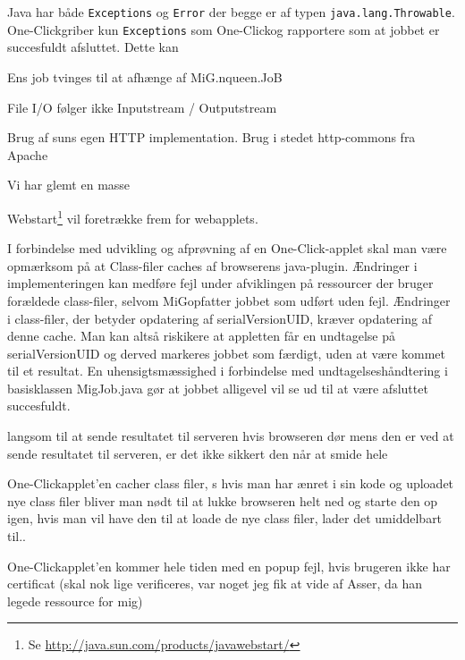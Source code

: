 \documentclass[pdf,draft,a4paper,11pt]{article}
\newcommand{\mig}{MiG}
\newcommand{\oc}{One-Click}
\begin{document}
\begin{description}
	\item[Job fejler ikke hvis der kastes en kastes en \texttt{java.lang.Error}]  Java har både \texttt{Exceptions} og \texttt{Error} der begge er af typen \texttt{java.lang.Throwable}. \oc griber kun \texttt{Exceptions} som \oc og rapportere som at jobbet er succesfuldt afsluttet. Dette kan  
	\item Ens job tvinges til at afhænge af MiG.nqueen.JoB
	\item File I/O følger ikke Inputstream / Outputstream	
	\item Brug af suns egen HTTP implementation. Brug i stedet http-commons fra Apache
	\item Vi har glemt en masse 
	\item Webstart\footnote{Se \url{http://java.sun.com/products/javawebstart/}} vil foretrække frem for webapplets.
\end{description}

I forbindelse med udvikling og afprøvning af en \oc-applet skal man være opmærksom på at Class-filer caches af browserens java-plugin. Ændringer i implementeringen kan medføre fejl under afviklingen på ressourcer der bruger forældede class-filer, selvom \mig opfatter jobbet som udført uden fejl. Ændringer i class-filer, der betyder opdatering af serialVersionUID, kræver opdatering af denne cache. Man kan altså riskikere at appletten får en undtagelse på serialVersionUID og derved markeres jobbet som færdigt, uden at være kommet til et resultat. En uhensigtsmæssighed i forbindelse med undtagelseshåndtering i basisklassen MigJob.java gør at jobbet alligevel vil se ud til at være afsluttet succesfuldt. 

langsom til at sende resultatet til serveren hvis browseren dør mens den er ved
at sende resultatet til serveren, er det ikke sikkert den når at smide hele

\oc applet'en cacher class filer, s hvis man har ænret i sin kode og
uploadet nye class filer bliver man nødt til at lukke browseren helt ned og
starte den op igen, hvis man vil have den til at loade de nye class filer, lader
det umiddelbart til.. 

\oc applet'en kommer hele tiden med en popup fejl, hvis brugeren ikke har
certificat (skal nok lige verificeres, var noget jeg fik at vide af Asser, da
han legede ressource for mig) 
\end{document}
